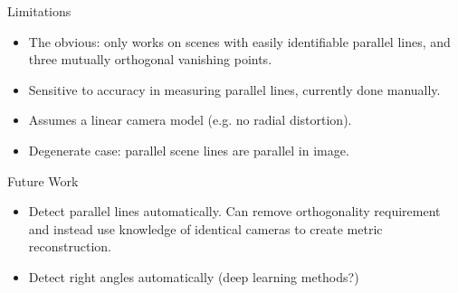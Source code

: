 \documentclass{beamer}
\begin{document}
{
	\begin{frame}[plain]
	\end{frame}
}
{
	\begin{frame}[plain]
	\end{frame}
}
{
	\begin{frame}[plain]
	\end{frame}
}
{
	\begin{frame}[plain]
	\end{frame}
}
{
	\begin{frame}[plain]
	\end{frame}
}
{
	\begin{frame}[plain]
	\end{frame}
}
{
	\begin{frame}[plain]
	\end{frame}
}
{
	\begin{frame}[plain]
	\end{frame}
}

\begin{frame}{Limitations}

\begin{itemize}
\item The obvious: only works on scenes with easily identifiable parallel lines, and three mutually orthogonal vanishing points.
\item Sensitive to accuracy in measuring parallel lines, currently done manually.
\item Assumes a linear camera model (e.g. no radial distortion).
\item Degenerate case: parallel scene lines are parallel in image.
\end{itemize}

\end{frame}  

\begin{frame}{Future Work}
\begin{itemize}
\item Detect parallel lines automatically. Can remove orthogonality requirement and instead use knowledge of identical cameras to create metric reconstruction.
\item Detect right angles automatically (deep learning methods?)

\end{itemize}
\end{frame}
\end{document}
